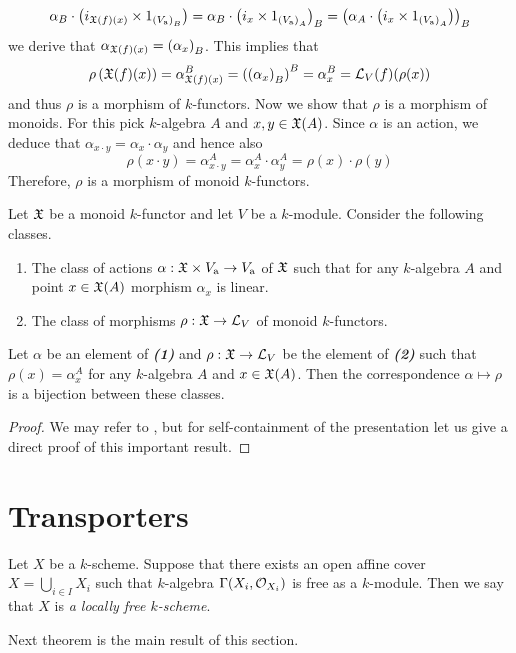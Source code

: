 $$\alpha_B\cdot \left(i_{{\mathfrak X}(f)(x)}\times 1_{\left(V_{\mathrm{a}}\right)_B}\right) = \alpha_B\cdot \left(i_{x}\times 1_{\left(V_{\mathrm{a}}\right)_A}\right)_B = \left(\alpha_A\cdot \left(i_{x}\times 1_{\left(V_{\mathrm{a}}\right)_A}\right)\right)_B$$
we derive that $\alpha_{{\mathfrak X}(f)(x)} = \left(\alpha_x\right)_B$. This implies that
$$\rho\left({\mathfrak X}(f)(x)\right) = \alpha_{{\mathfrak X}(f)(x)}^B = \left(\left(\alpha_x\right)_B\right)^B= \alpha_x^B = {\mathcal L}_V(f)(\rho(x))$$
and thus $\rho$ is a morphism of $k$-functors. Now we show that $\rho$ is a morphism of monoids. For this pick $k$-algebra $A$ and $x, y\in {\mathfrak X}(A)$. Since $\alpha$ is an action, we deduce that $\alpha_{x \cdot y} = \alpha_x\cdot \alpha_y$ and hence also
$$\rho(x\cdot y) = \alpha^A_{x \cdot y} = \alpha^A_x\cdot \alpha^A_y = \rho(x)\cdot \rho(y)$$
Therefore, $\rho$ is a morphism of monoid $k$-functors.

\begin{theorem}\label{theorem:characterizationsoflinearrepresentations}
Let ${\mathfrak X}$ be a monoid $k$-functor and let $V$ be a $k$-module. Consider the following classes. 
\begin{enumerate}[label=\emph{\textbf{(\arabic*)}}, leftmargin=1.5em]
\item The class of actions $\alpha:{\mathfrak X}\times V_{\mathrm{a}}\rightarrow V_{\mathrm{a}}$ of ${\mathfrak X}$ such that for any $k$-algebra $A$ and point $x\in {\mathfrak X}(A)$ morphism $\alpha_x$ is linear.
\item The class of morphisms $\rho:{\mathfrak X}\rightarrow {\mathcal L}_V$ of monoid $k$-functors.
\end{enumerate}
Let $\alpha$ be an element of \emph{\textbf{(1)}} and $\rho:{\mathfrak X}\rightarrow {\mathcal L}_V$ be the element of \emph{\textbf{(2)}} such that $\rho(x) = \alpha_x^A$ for any $k$-algebra $A$ and $x\in {\mathfrak X}(A)$. Then the correspondence $\alpha \mapsto \rho$ is a bijection between these classes.
\end{theorem}
\begin{proof}
We may refer to {\cite[Theorem 6.3]{Presheaves}}, but for self-containment of the presentation let us give a direct proof of this important result.
\end{proof}

\section{Transporters}

\begin{definition}
Let $X$ be a $k$-scheme. Suppose that there exists an open affine cover $X = \bigcup_{i\in I}X_i$ such that $k$-algebra $\Gamma(X_i,{\mathcal O}_{X_i})$ is free as a $k$-module. Then we say that $X$ is \textit{a locally free $k$-scheme}.
\end{definition}
\noindent
Next theorem is the main result of this section.

